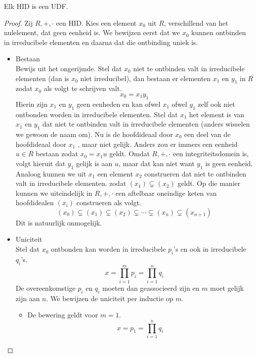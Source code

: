 \documentclass[main.tex]{subfiles}
\begin{document}
\begin{st}
  Elk HID is een UDF.

  \begin{proof}
    Zij $R,+,\cdot$ een HID.
    Kies een element $x_{0}$ uit $R$, verschillend van het nulelement, dat geen eenheid is.
    We bewijzen eerst dat we $x_{0}$ kunnen ontbinden in irreducibele elementen en daarna dat die ontbinding uniek is.
    \begin{itemize}
    \item Bestaan\\
      Bewijs uit het ongerijmde.
      Stel dat $x_{0}$ niet te ontbinden valt in irreducibele elementen (dan is $x_{0}$ niet irreducibel), dan bestaan er elementen $x_{1}$ en $y_{1}$ in $R$ zodat $x_{0}$ als volgt te schrijven valt.
      \[ x_{0} = x_{1}y_{1} \]
      Hierin zijn $x_{1}$ en $y_{1}$ geen eenheden \waarom en kan ofwel $x_{1}$ ofwel $y_{1}$ zelf ook niet ontbonden worden in irreducibele elementen.
      Stel dat $x_{1}$ het element is van $x_{1}$ en $y_{1}$ dat niet te ontbinden valt in irreducibele elementen (anders wisselen we gewoon de naam om).
      Nu is de hoofdideaal door $x_{0}$ een deel van de hoofdideaal door $x_{1}$ \waarom, maar niet gelijk.
      Anders zou er immers een eenheid $u\in R$ bestaan zodat $x_{0}=x_{1}u$ geldt.
      Omdat $R,+,\cdot$ een integriteitsdomein is, volgt hieruit dat $y_{1}$ gelijk is aan $u$, maar dat kan niet want $y_{1}$ is geen eenheid.
      Analoog kunnen we uit $x_{1}$ een element $x_{2}$ construeren dat niet te ontbinden valt in irreducibele elementen. zodat $(x_{1}) \subsetneq (x_{2})$ geldt.
      Op die manier kunnen we uiteindelijk in $R,+,\cdot$ een aftelbaar oneindige keten van hoofdidealen $(x_{i})$ construeren als volgt.
      \[ (x_{0}) \subsetneq (x_{1}) \subsetneq (x_{2}) \subsetneq \dotsb \subsetneq (x_{n}) \subsetneq (x_{n+1}) \]
      Dit is natuurlijk onmogelijk.
    \item Uniciteit\\
      Stel dat $x_{0}$ ontbonden kan worden in irreducibele $p_{i}$'s en ook in irreducibele $q_{i}$'s.
      \[ x = \prod_{i=1}^{m}p_{i} = \prod_{i=1}^{n}q_{i} \]
      De overeenkomstige $p_{i}$ en $q_{i}$ moeten dan geassocieerd zijn en $m$ moet gelijk zijn aan $n$.
      We bewijzen de uniciteit per inductie op $m$.
      \begin{itemize}
      \item De bewering geldt voor $m=1$.
        \[ x = p_{1} = \prod_{i=1}^{n}q_{i} \]

\end{itemize}
\end{itemize}
\end{proof}
\end{st}
\end{document}
